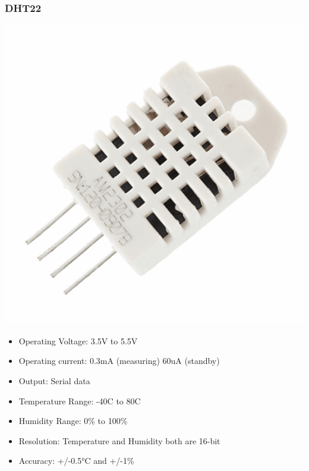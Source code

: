 \documentclass[12pt,a4paper,portrait]{article}
\begin{document}
			\subsubsection{DHT22}
				\begin{center}
					\includegraphics[scale=0.2]{./img/dht22.png}
				\end{center}
			\begin{itemize}
				\item Operating Voltage: 3.5V to 5.5V
				\item Operating current: 0.3mA (measuring) 60uA (standby)
				\item Output: Serial data
				\item Temperature Range: -40\textdegree C to 80\textdegree C
				\item Humidity Range: 0\% to 100\%
				\item Resolution: Temperature and Humidity both are 16-bit
				\item Accuracy: +/-0.5°C and +/-1\%
			\end{itemize}
\end{document}
